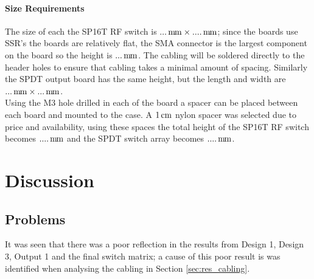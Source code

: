 \documentclass[12pt,openany,a4paper]{book}
\newcommand{\pack}	{\hspace{-0.08em}}
\newcommand{\cm}	{\ensuremath{\rm\,cm}}
\newcommand{\mm}	{\ensuremath{\rm\,m\pack m}}
\begin{document}
\subsubsection{Size Requirements}
The size of each the SP16T RF switch is $...\mm \times ....\mm$; since the boards use SSR's the boards are relatively flat, the SMA connector is the largest component on the board so the height is $...\mm$. The cabling will be soldered directly to the header holes to ensure that cabling takes a minimal amount of spacing. Similarly the SPDT output board has the same height, but the length and width are $...\mm \times ...\mm$. \\[0.2cm]
Using the M3 hole drilled in each of the board a spacer can be placed between each board and mounted to the case. A $1\cm$ nylon spacer was selected due to price and availability, using these spaces the total height of the SP16T RF switch becomes $....\mm$ and the SPDT switch array becomes $....\mm$.



















\chapter{Discussion}
\section{Problems}
It was seen that there was a poor reflection in the results from Design 1, Design 3, Output 1 and the final switch matrix; a cause of this poor result is was identified when analysing the cabling in Section \ref{sec:res_cabling}. 
\end{document}

